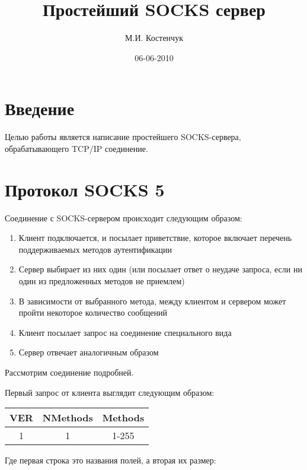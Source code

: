 \documentclass[a4paper,11pt]{article}
\title{Простейший SOCKS сервер}
\author{М.И. Костенчук}
\date{06-06-2010}
\begin{document}
\maketitle

\tableofcontents

\section{Введение}

Целью работы является написание простейшего SOCKS-сервера, обрабатывающего TCP/IP соединение. 

\section{Протокол SOCKS 5}

Соединение с SOCKS-сервером происходит следующим образом:

\begin{enumerate}

  \item Клиент подключается, и посылает приветствие, которое включает перечень поддерживаемых методов аутентификации

  \item Сервер выбирает из них один (или посылает ответ о неудаче запроса, если ни один из предложенных методов не приемлем)

  \item В зависимости от выбранного метода, между клиентом и сервером может пройти некоторое количество сообщений

  \item Клиент посылает запрос на соединение специального вида

  \item Сервер отвечает аналогичным образом

\end{enumerate}

Рассмотрим соединение подробней.

Первый запрос от клиента выглядит следующим образом:

\begin{tabular}{|c|c|c|}
  \hline  
  VER & NMethods & Methods \\
  \hline  
  1 & 1 & 1-255  \\  
  \hline
\end{tabular}

Где первая строка это названия полей, а вторая их размер:
\end{document}
